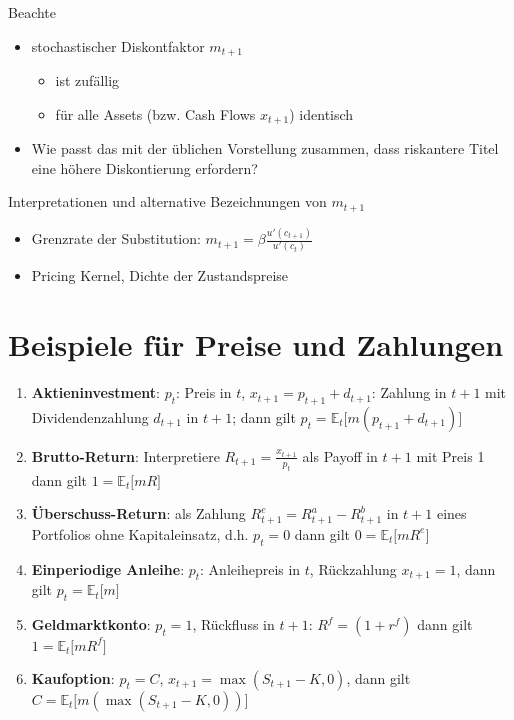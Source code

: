 \documentclass[12pt]{extreport} %
\theoremstyle{named}
\theoremstyle{nnamed}
\theoremstyle{itshape}
\theoremstyle{normal}
\begin{document}
Beachte
\begin{itemize}
	\item stochastischer Diskontfaktor $m_{t+1}$
		\begin{itemize}
			\item ist zufällig
			\item für alle Assets (bzw. Cash Flows $x_{t+1}$) identisch
		\end{itemize}
	\item Wie passt das mit der üblichen Vorstellung zusammen, dass riskantere Titel eine höhere Diskontierung erfordern?
\end{itemize}

Interpretationen und alternative Bezeichnungen von $m_{t+1}$
\begin{itemize}
	\item Grenzrate der Substitution: $m_{t+1} = \beta \frac{u'(c_{t+1})}{u'(c_t)}$
	\item Pricing Kernel, Dichte der Zustandspreise
\end{itemize}

\section{Beispiele für Preise und Zahlungen}

\begin{enumerate}[label=\arabic*\upshape.]
	\item \textbf{Aktieninvestment}: $p_t$: Preis in $t$, $x_{t+1} = p_{t+1} + d_{t+1}$: Zahlung in $t+1$ mit Dividendenzahlung $d_{t+1}$ in $t+1$; dann gilt $p_t = \mathbb{E}_t \big[ m ( p_{t+1} + d_{t+1} ) \big]$
	\item \textbf{Brutto-Return}: Interpretiere $R_{t+1} = \frac{x_{t+1}}{p_t}$ als Payoff in $t + 1$ mit Preis 1 dann gilt $1 = \mathbb{E}_t \big[ mR \big]$
	\item \textbf{Überschuss-Return}: als Zahlung $R_{t+1}^e = R_{t+1}^a - R_{t+1}^b$ in $t + 1$ eines Portfolios ohne Kapitaleinsatz, d.h. $p_t = 0$ dann gilt $0 = \mathbb{E}_t \big[ mR^e \big]$
	\item \textbf{Einperiodige Anleihe}: $p_t$: Anleihepreis in $t$, Rückzahlung $x_{t+1} = 1$, dann gilt $p_t = \mathbb{E}_t \big[ m \big]$
	\item \textbf{Geldmarktkonto}: $p_t = 1$, Rückfluss in $t + 1$: $R^f = (1 + r^f)$ dann gilt $1 = \mathbb{E}_t \big[ mR^f \big]$
	\item \textbf{Kaufoption}: $p_t = C$, $x_{t+1} = \max(S_{t+1} - K, 0)$, dann gilt $C = \mathbb{E}_t \big[ m \left( \max ( S_{t+1} - K, 0 ) \right) \big]$
\end{enumerate}
\end{document}
